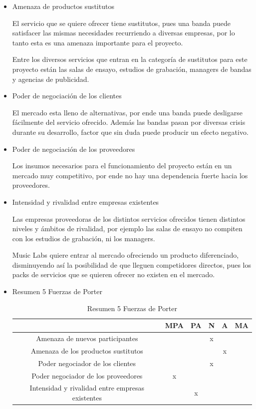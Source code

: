 \begin{itemize}
 
\item Amenaza de productos sustitutos

	El servicio que se quiere ofrecer tiene sustitutos, pues una banda puede satisfacer las mismas necesidades recurriendo a diversas empresas, por lo tanto esta es una amenaza importante para el proyecto. 

	Entre los diversos servicios que entran en la categoría de sustitutos para este proyecto están las salas de ensayo, estudios de grabación, managers de bandas y agencias de publicidad.

\item Poder de negociación de los clientes

	El mercado esta lleno de alternativas, por ende una banda puede desligarse fácilmente del servicio ofrecido. Además las bandas pasan por diversas crisis durante su desarrollo, factor que sin duda puede producir un efecto negativo.

\item Poder de negociación de los proveedores

	Los insumos necesarios para el funcionamiento del proyecto están en un mercado muy competitivo, por ende no hay una dependencia fuerte hacia los proveedores.

\item Intensidad y rivalidad entre empresas existentes

	Las empresas proveedoras de los distintos servicios ofrecidos tienen distintos niveles y ámbitos de rivalidad, por ejemplo las salas de ensayo no compiten con los estudios de grabación, ni los managers. 

	Music Labs quiere entrar al mercado ofreciendo un producto diferenciado, disminuyendo así la posibilidad de que lleguen competidores directos, pues los packs de servicios que se quieren ofrecer no existen en el mercado.
		
\item Resumen 5 Fuerzas de Porter

\begin{table}[h]
\centering
	\begin{tabular}{|c|c|c|c|c|c|}
		\hline
		                                                 & MPA & PA & N & A & MA \\
		\hline
		Amenaza de nuevos participantes                  &     &    & x &   & \\
		\hline
		Amenaza de los productos sustitutos              &     &    &   & x & \\
		\hline
		Poder negociador de los clientes                 &     &    & x &   & \\
		\hline
		Poder negociador de los proveedores              & x   &    &   &   & \\
		\hline
		Intensidad y rivalidad entre empresas existentes &     & x  &   &   & \\
		\hline
	\end{tabular}
\caption{Resumen 5 Fuerzas de Porter}
\end{table}


\end{itemize}

